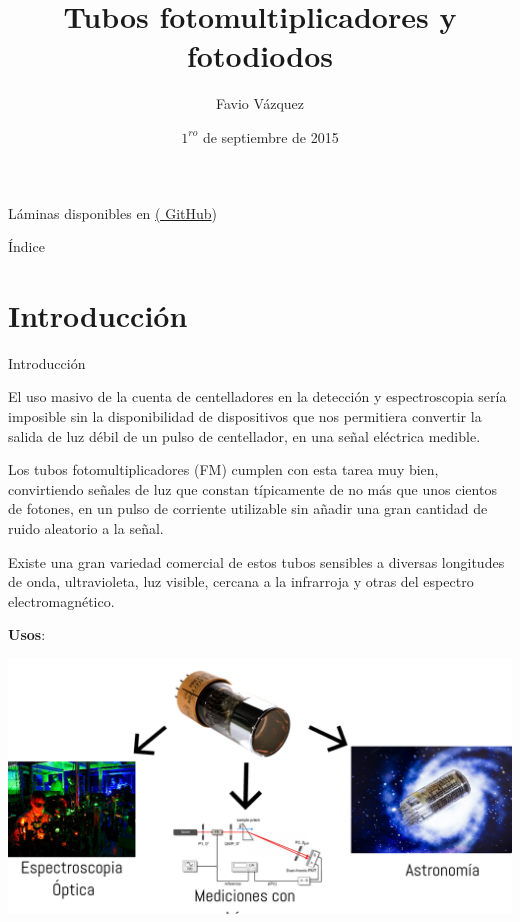 \documentclass[a4paper,10pt]{beamer}
\begin{document}
\begin{frame}
\Large
\title{Tubos fotomultiplicadores y fotodiodos}
\author{Favio Vázquez}
\date{$1^{ro}$ de septiembre de 2015}

Láminas disponibles en \href{https://github.com/FavioVazquez/DeteccionRayosCosmicos-PCF}{(\color{blue} GitHub})

\maketitle
\end{frame}

\begin{frame}{Índice}

\tableofcontents

\end{frame}

\section{Introducción}
\begin{frame}[allowframebreaks]{Introducción}
\begin{justify}
 El uso masivo de la cuenta de centelladores en la detección y espectroscopia sería 
 imposible sin la disponibilidad de dispositivos que nos permitiera convertir la 
 salida de luz débil de un pulso de centellador, en una señal eléctrica medible. 
 
 \vspace{.3cm}
 
 Los tubos fotomultiplicadores (FM) cumplen con esta tarea muy bien, convirtiendo señales 
 de luz que constan típicamente de no más que unos cientos de fotones, en un pulso 
 de corriente utilizable sin añadir una gran cantidad de ruido aleatorio a la señal.
 
\framebreak

 Existe una gran variedad comercial de estos tubos sensibles a diversas longitudes de onda,
 ultravioleta, luz visible, cercana a la infrarroja y otras del espectro electromagnético.
 
 \vspace{.3cm}
 
 \textbf{Usos}:
 
 \begin{center}
   \includegraphics[scale=0.2]{fig1}
 \end{center}

 
 \end{justify}
\end{frame}
\end{document}

